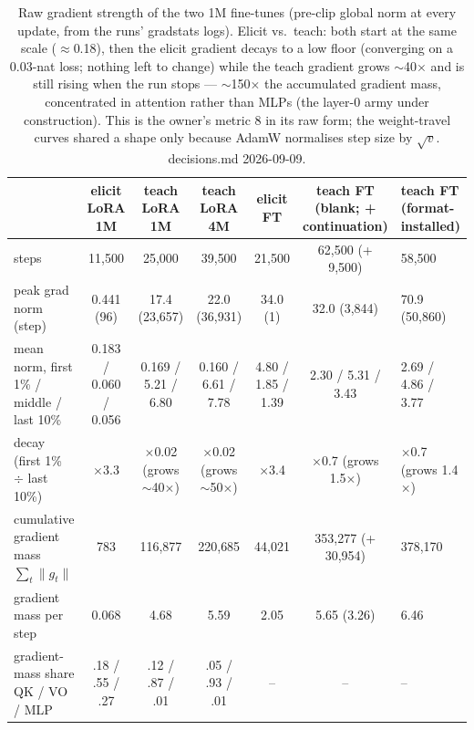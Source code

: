 \begin{table}[t]
\centering
\begin{tabular}{lccccc}
\hline
 & elicit LoRA 1M & teach LoRA 1M & teach LoRA 4M & elicit FT & teach FT (blank; + continuation) & teach FT (format-installed) \\
\hline
steps & 11{,}500 & 25{,}000 & 39{,}500 & 21{,}500 & 62{,}500 (+ 9{,}500) & 58{,}500 \\
peak grad norm (step) & 0.441 (96) & 17.4 (23{,}657) & 22.0 (36{,}931) & 34.0 (1) & 32.0 (3{,}844) & 70.9 (50{,}860) \\
mean norm, first 1\% / middle / last 10\% & 0.183 / 0.060 / 0.056 & 0.169 / 5.21 / 6.80 & 0.160 / 6.61 / 7.78 & 4.80 / 1.85 / 1.39 & 2.30 / 5.31 / 3.43 & 2.69 / 4.86 / 3.77 \\
decay (first 1\% $\div$ last 10\%) & $\times$3.3 & $\times$0.02 (grows $\sim$40$\times$) & $\times$0.02 (grows $\sim$50$\times$) & $\times$3.4 & $\times$0.7 (grows 1.5$\times$) & $\times$0.7 (grows 1.4$\times$) \\
cumulative gradient mass $\sum_t\|g_t\|$ & 783 & 116{,}877 & 220{,}685 & 44{,}021 & 353{,}277 (+ 30{,}954) & 378{,}170 \\
gradient mass per step & 0.068 & 4.68 & 5.59 & 2.05 & 5.65 (3.26) & 6.46 \\
gradient-mass share QK / VO / MLP & .18 / .55 / .27 & .12 / .87 / .01 & .05 / .93 / .01 & -- & -- & -- \\
\hline
\end{tabular}
\caption{Raw gradient strength of the two 1M fine-tunes (pre-clip global norm at every update, from the runs' gradstats logs). Elicit vs.\ teach: both start at the same scale ($\approx$0.18), then the elicit gradient decays to a low floor (converging on a 0.03-nat loss; nothing left to change) while the teach gradient grows $\sim$40$\times$ and is still rising when the run stops --- $\sim$150$\times$ the accumulated gradient mass, concentrated in attention rather than MLPs (the layer-0 army under construction). This is the owner's metric 8 in its raw form; the weight-travel curves shared a shape only because AdamW normalises step size by $\sqrt{v}$. decisions.md 2026-09-09.}
\label{tab:grad_strength}
\end{table}
